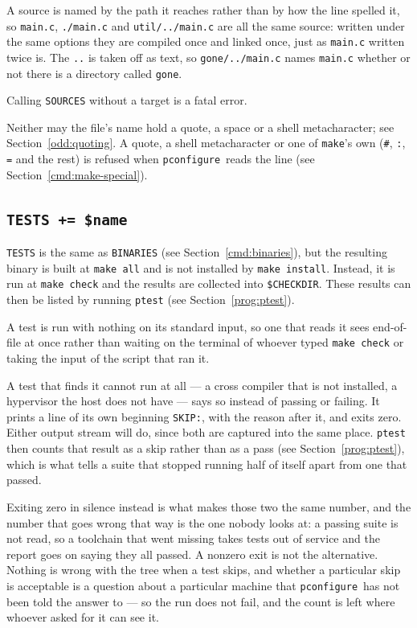 \documentclass{article}
\newcommand{\pconfigure}{\texttt{pconfigure}}
\begin{document}
A source is named by the path it reaches rather than by how the line
spelled it, so \texttt{main.c}, \texttt{./main.c} and
\texttt{util/../main.c} are all the same source: written under the
same options they are compiled once and linked once, just as
\texttt{main.c} written twice is.  The \texttt{..} is taken off as
text, so \texttt{gone/../main.c} names \texttt{main.c} whether or not
there is a directory called \texttt{gone}.

Calling \texttt{SOURCES} without a target is a fatal error.

Neither may the file's name hold a quote, a space or a shell
metacharacter; see Section~\ref{odd:quoting}.  A quote, a shell
metacharacter or one of \texttt{make}'s own (\texttt{\#}, \texttt{:},
\texttt{=} and the rest) is refused when \pconfigure\ reads the line
(see Section~\ref{cmd:make-special}).

\subsection{\texttt{TESTS += \$name} \label{cmd:tests}}

\texttt{TESTS} is the same as \texttt{BINARIES} (see
Section~\ref{cmd:binaries}), but the resulting binary is built at
\texttt{make all} and is not installed by \texttt{make install}.
Instead, it is run at \texttt{make check} and the results are
collected into \texttt{\$CHECKDIR}.  These results can then be listed
by running \texttt{ptest} (see Section~\ref{prog:ptest}).

A test is run with nothing on its standard input, so one that reads it
sees end-of-file at once rather than waiting on the terminal of
whoever typed \texttt{make check} or taking the input of the script
that ran it.

A test that finds it cannot run at all --- a cross compiler that is
not installed, a hypervisor the host does not have --- says so instead
of passing or failing.  It prints a line of its own beginning
\texttt{SKIP:}, with the reason after it, and exits zero.  Either
output stream will do, since both are captured into the same place.
\texttt{ptest} then counts that result as a skip rather than as a pass
(see Section~\ref{prog:ptest}), which is what tells a suite that
stopped running half of itself apart from one that passed.

Exiting zero in silence instead is what makes those two the same
number, and the number that goes wrong that way is the one nobody
looks at: a passing suite is not read, so a toolchain that went
missing takes tests out of service and the report goes on saying they
all passed.  A nonzero exit is not the alternative.  Nothing is wrong
with the tree when a test skips, and whether a particular skip is
acceptable is a question about a particular machine that
\pconfigure\ has not been told the answer to --- so the run does not
fail, and the count is left where whoever asked for it can see it.
\end{document}
